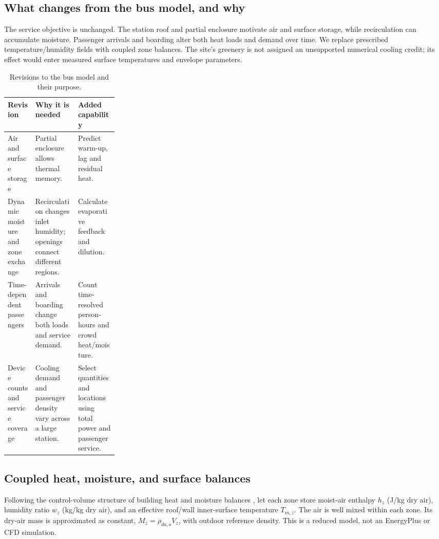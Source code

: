 \subsection{What changes from the bus model, and why}

The service objective is unchanged. The station roof and partial enclosure motivate air and surface storage, while recirculation can accumulate moisture. Passenger arrivals and boarding alter both heat loads and demand over time. We replace prescribed temperature/humidity fields with coupled zone balances. The site's greenery is not assigned an unsupported numerical cooling credit; its effect would enter measured surface temperatures and envelope parameters.

\begin{table}[!ht]
\centering\small
\caption{Revisions to the bus model and their purpose.}
\label{tab:rail-changes}
\begin{tabularx}{\linewidth}{@{}>{\raggedright\arraybackslash}p{0.25\linewidth}>{\raggedright\arraybackslash}X>{\raggedright\arraybackslash}X@{}}
\toprule
Revision & Why it is needed & Added capability\\
\midrule
Air and surface storage & Partial enclosure allows thermal memory. & Predict warm-up, lag and residual heat.\\
Dynamic moisture and zone exchange & Recirculation changes inlet humidity; openings connect different regions. & Calculate evaporative feedback and dilution.\\
Time-dependent passengers & Arrivals and boarding change both loads and service demand. & Count time-resolved person-hours and crowd heat/moisture.\\
Device counts and service coverage & Cooling demand and passenger density vary across a large station. & Select quantities and locations using total power and passenger service.\\
\bottomrule
\end{tabularx}
\end{table}

\subsection{Coupled heat, moisture, and surface balances}

Following the control-volume structure of building heat and moisture balances \cite{epzone}, let each zone store moist-air enthalpy $h_z$ (J/kg dry air), humidity ratio $w_z$ (kg/kg dry air), and an effective roof/wall inner-surface temperature $T_{m,z}$. The air is well mixed within each zone. Its dry-air mass is approximated as constant, $M_z=\rho_{da,o}V_z$, with outdoor reference density. This is a reduced model, not an EnergyPlus or CFD simulation.

